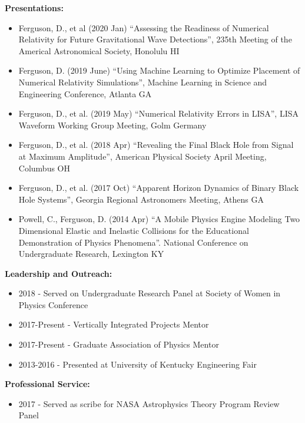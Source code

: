 \documentclass[11pt]{article}
\begin{document}
\begin{flushleft}
  \textbf{Presentations:}
  \begin{itemize}
  \item Ferguson, D., et al (2020 Jan) ``Assessing the Readiness of Numerical Relativity for Future Gravitational Wave Detections'', 235th Meeting of the Americal Astronomical Society, Honolulu HI
  \item Ferguson, D. (2019 June) ``Using Machine Learning to Optimize Placement of Numerical Relativity Simulations'', Machine Learning in Science and Engineering Conference, Atlanta GA
  \item Ferguson, D., et al. (2019 May) ``Numerical Relativity Errors in LISA'', LISA Waveform Working Group Meeting, Golm Germany
  \item Ferguson, D., et al. (2018 Apr) ``Revealing the Final Black Hole from Signal at Maximum Amplitude'', American Physical Society April Meeting, Columbus OH
  \item Ferguson, D., et al. (2017 Oct) ``Apparent Horizon Dynamics of Binary Black Hole Systems'', Georgia Regional Astronomers Meeting, Athens GA
  \item Powell, C., Ferguson, D. (2014 Apr) ``A Mobile Physics Engine Modeling Two Dimensional Elastic and Inelastic Collisions for the Educational Demonstration of Physics Phenomena''. National Conference on Undergraduate Research, Lexington KY  
  \end{itemize}
  
  \textbf{Leadership and Outreach:}
  \begin{itemize}
  \item 2018 - Served on Undergraduate Research Panel at Society of Women in Physics Conference
  \item 2017-Present - Vertically Integrated Projects Mentor
  \item 2017-Present - Graduate Association of Physics Mentor
  \item 2013-2016 - Presented at University of Kentucky Engineering Fair
  \end{itemize}

  \textbf{Professional Service: }
  \begin{itemize}
  \item 2017 - Served as scribe for NASA Astrophysics Theory Program Review Panel
  \end{itemize}
  
\end{flushleft}
\end{document}
